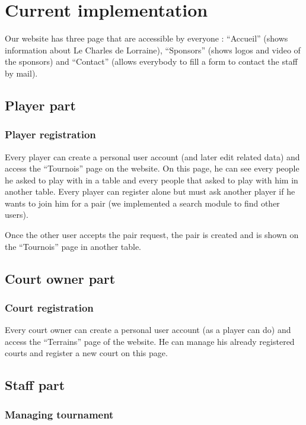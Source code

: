 \section{Current implementation}

Our website has three page that are accessible by everyone : \enquote{Accueil} (shows information about Le Charles de Lorraine), \enquote{Sponsors} (shows logos and video of the sponsors) and \enquote{Contact} (allows everybody to fill a form to contact the staff by mail).

\subsection{Player part}

\subsubsection{Player registration}

Every player can create a personal user account (and later edit related data) and access the \enquote{Tournois} page on the website. On this page, he can see every people he asked to play with in a table and every people that asked to play with him in another table. Every player can register alone but must ask another player if he wants to join him for a pair (we implemented a search module to find other users).

Once the other user accepts the pair request, the pair is created and is shown on the \enquote{Tournois} page in another table.

\subsection{Court owner part}

\subsubsection{Court registration}

Every court owner can create a personal user account (as a player can do) and access the \enquote{Terrains} page of the website. He can manage his already registered courts and register a new court on this page.

\subsection{Staff part}

\subsubsection{Managing tournament}

